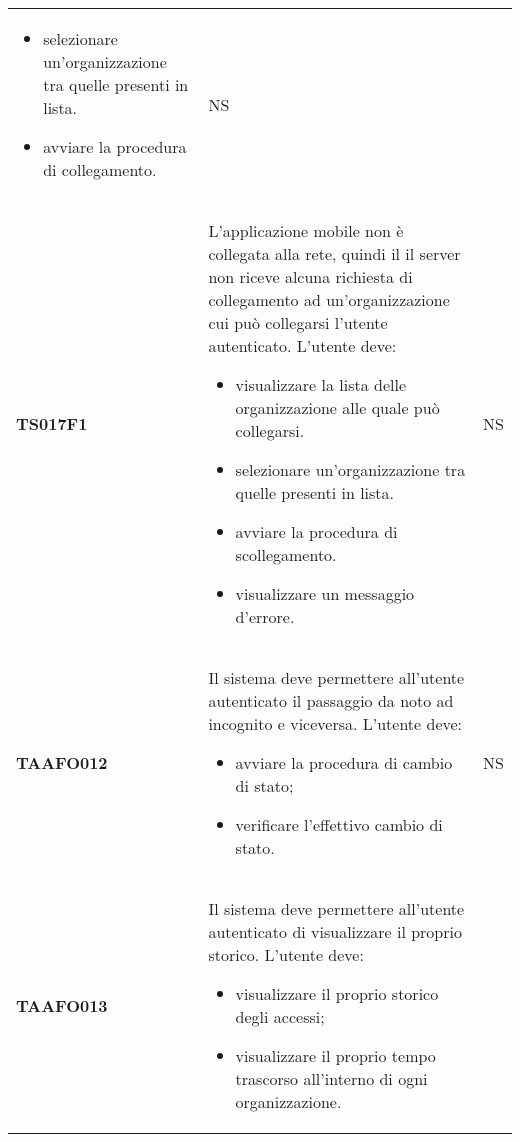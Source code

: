 \documentclass[../piano-di-qualifica.tex]{subfiles}
\begin{document}
\begin{centering}
\begin{longtable}[H]{>{\centering\bfseries}m{3cm} >{}p{10cm} >{\centering\arraybackslash}m{3cm}}
\begin{itemize}
                        \item selezionare un'organizzazione tra quelle presenti in lista.
                        \item avviare la procedura di collegamento.
                      \end{itemize}
                & NS \\
        TS017F1    & L'applicazione mobile non è collegata alla rete, quindi il il server non riceve alcuna richiesta di collegamento ad un'organizzazione  cui può collegarsi l'utente autenticato. \newline
                    L'utente deve:
                      \begin{itemize}
                        \item visualizzare la lista delle organizzazione alle quale può collegarsi.
                        \item selezionare un'organizzazione tra quelle presenti in lista.
                        \item avviare la procedura di scollegamento.
                        \item visualizzare un messaggio d'errore.
                      \end{itemize}
                    & NS \\
        TAAFO012      & Il sistema deve permettere all'utente autenticato il passaggio da noto ad incognito e viceversa. \newline
                      L'utente deve:
                      \begin{itemize}
                        \item avviare la procedura di cambio di stato;
                        \item verificare l'effettivo cambio di stato.
                      \end{itemize}
                      & NS \\
        TAAFO013      & Il sistema deve permettere all'utente autenticato di visualizzare il proprio storico. \newline
                      L'utente deve:
                      \begin{itemize}
                        \item visualizzare il proprio storico degli accessi;
                        \item visualizzare il proprio tempo trascorso all'interno di ogni organizzazione.
                      \end{itemize}

\end{longtable}
\end{centering}
\end{document}
